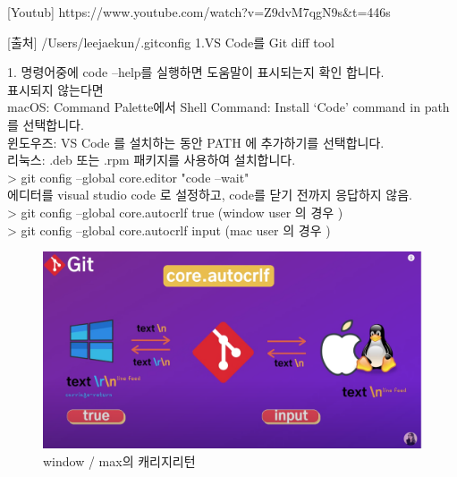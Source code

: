 [Youtub] https://www.youtube.com/watch?v=Z9dvM7qgN9s\&t=446s


[출처] /Users/leejaekun/.gitconfig
1.VS Code를 Git diff tool

1. 명령어중에 code --help를 실행하면 도움말이 표시되는지 확인 합니다.\\
표시되지 않는다면 \\
macOS: Command Palette에서 Shell Command: Install ‘Code’ command in path를 선택합니다.\\
윈도우즈: VS Code 를 설치하는 동안 PATH 에 추가하기를 선택합니다.\\
리눅스: .deb 또는 .rpm 패키지를 사용하여 설치합니다.\\

\noindent > git config --global core.editor "code --wait"\\
에디터를 visual studio code 로 설정하고, code를 닫기 전까지 응답하지 않음. \\

\noindent > git config --global core.autocrlf true  (window user 의 경우 )\\
\noindent > git config --global core.autocrlf input (mac user 의 경우 )\\
%
\begin{figure} [!htbp] %
	\centering
	\captionsetup{justification=centering,margin=1cm}
	\includegraphics[width=0.7\linewidth]{./fig/autocrlf.png}
	\caption{window / max의 캐리지리턴}
	\label{fig:autocrlf}
\end{figure} 
%




\newpage
{} 
\noindent [출처] \href{https://reddb.tistory.com/146?category=948284}{\color{blue}{https://reddb.tistory.com/146?category=948284}}


